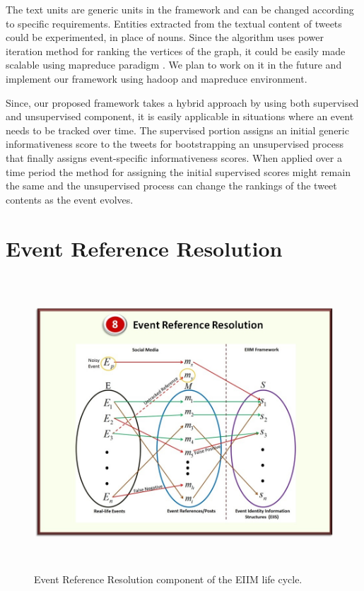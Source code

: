 The text units are generic units in the framework and can be changed according to specific requirements. Entities extracted from the textual content of tweets could be experimented, in place of nouns. Since the algorithm uses power iteration method for ranking the vertices of the graph, it could be easily made scalable using mapreduce paradigm \cite{lin2010design}. We plan to work on it in the future and implement our framework using hadoop and mapreduce environment. 

Since, our proposed framework takes a hybrid approach by using both supervised and unsupervised component, it is easily applicable in situations where an event needs to be tracked over time. The supervised portion assigns an initial generic informativeness score to the tweets for bootstrapping an unsupervised process that finally assigns event-specific informativeness scores. When applied over a time period the method for assigning the initial supervised scores might remain the same and the unsupervised process can change the rankings of the tweet contents as the event evolves. 





\section{Event Reference Resolution}

\begin{figure}[htbp]
  \caption{Event Reference Resolution component of the EIIM life cycle.}
  \centering
    \includegraphics[width=14cm,height=11cm]{Figures/EIIMComponents/EventReferenceResolution.jpg}
\end{figure}

